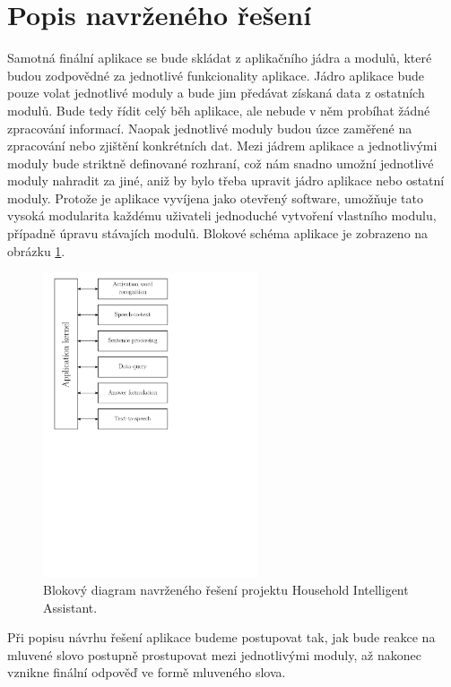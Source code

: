 \documentclass[12pt,a4paper]{article}
\begin{document}
\section*{Popis navrženého řešení}
Samotná finální aplikace se bude skládat z aplikačního jádra a modulů, které budou zodpovědné za jednotlivé funkcionality aplikace. Jádro aplikace bude pouze volat jednotlivé moduly a bude jim předávat získaná data z ostatních modulů. Bude tedy řídit celý běh aplikace, ale nebude v něm probíhat žádné zpracování informací. Naopak jednotlivé moduly budou úzce zaměřené na zpracování nebo zjištění konkrétních dat. Mezi jádrem aplikace a jednotlivými moduly bude striktně definované rozhraní, což nám snadno umožní jednotlivé moduly nahradit za jiné, aniž by bylo třeba upravit jádro aplikace nebo ostatní moduly. Protože je aplikace vyvíjena jako otevřený software, umožňuje tato vysoká modularita každému uživateli jednoduché vytvoření vlastního modulu, případně úpravu stávajích modulů. Blokové schéma aplikace je zobrazeno na obrázku \ref{fig:diagram api}.

\begin{figure}[ht]
	\begin{center}
	\includegraphics[height = 9cm]{blockDiagram.pdf}
	\caption{Blokový diagram navrženého řešení projektu Household Intelligent Assistant.}
	\label{fig:diagram api}
	\end{center}
\end{figure}

Při popisu návrhu řešení aplikace budeme postupovat tak, jak bude reakce na mluvené slovo postupně prostupovat mezi jednotlivými moduly, až nakonec vznikne finální odpověď ve formě mluveného slova.
\end{document}
